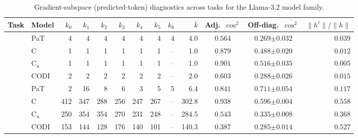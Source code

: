 \begin{table}[h!]
\centering
\small
\setlength{\tabcolsep}{2.5pt}
\caption{Gradient-subspace (predicted-token) diagnostics across tasks for the Llama-3.2 model family.}
\label{tab:subspace_geometry_llama_pred}
\begin{tabular}{llrrrrrrrrccr}
\toprule
Task & Model & $k_{0}$ & $k_{1}$ & $k_{2}$ & $k_{3}$ & $k_{4}$ & $k_{5}$ & $k_{6}$ & $\bar k$ & Adj.\ $\overline{\cos^2}$ & Off-diag.\ $\overline{\cos^2}$ & $\|h^c\|/\|h\|$ \\
\midrule
{} & PaT & 4 & 4 & 4 & 4 & 4 & 4 & 4 & 4.0 & $0.564$ & $0.269 {\scriptstyle \pm 0.032}$ & $0.039$ \\
 & C & 1 & 1 & 1 & 1 & 1 & 1 & \textcolor{gray}{--} & 1.0 & $0.879$ & $0.488 {\scriptstyle \pm 0.020}$ & $0.012$ \\
 & C$_u$ & 1 & 1 & 1 & 1 & 1 & 1 & \textcolor{gray}{--} & 1.0 & $0.901$ & $0.516 {\scriptstyle \pm 0.035}$ & $0.005$ \\
 & CODI & 2 & 2 & 2 & 2 & 2 & 2 & \textcolor{gray}{--} & 2.0 & $0.603$ & $0.288 {\scriptstyle \pm 0.026}$ & $0.015$ \\
\midrule
{} & PaT & 2 & 16 & 8 & 6 & 3 & 5 & 5 & 6.4 & $0.841$ & $0.711 {\scriptstyle \pm 0.054}$ & $0.117$ \\
 & C & 412 & 347 & 288 & 256 & 247 & 267 & \textcolor{gray}{--} & 302.8 & $0.938$ & $0.596 {\scriptstyle \pm 0.004}$ & $0.558$ \\
 & C$_u$ & 250 & 354 & 354 & 270 & 231 & 248 & \textcolor{gray}{--} & 284.5 & $0.543$ & $0.335 {\scriptstyle \pm 0.008}$ & $0.368$ \\
 & CODI & 153 & 144 & 128 & 176 & 140 & 101 & \textcolor{gray}{--} & 140.3 & $0.387$ & $0.285 {\scriptstyle \pm 0.014}$ & $0.527$ \\
\bottomrule
\end{tabular}
\end{table}